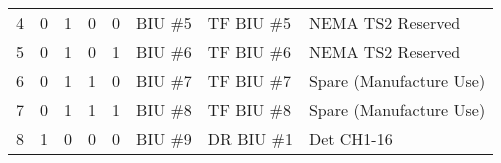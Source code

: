 \documentclass[]{article}
\begin{document}
\begin{table}[ht]
\begin{tabular}{llllllll}
			4            & 0              & 1              & 0              & 0              & BIU \#5                              & TF BIU \#5                            & NEMA TS2 Reserved                                                                                                                                                                                                                                                                                                                                                                         \\
			5            & 0              & 1              & 0              & 1              & BIU \#6                              & TF BIU \#6                            & NEMA TS2 Reserved                                                                                                                                                                                                                                                                                                                                                                         \\
			6            & 0              & 1              & 1              & 0              & BIU \#7                              & TF BIU \#7                            & Spare (Manufacture Use)                                                                                                                                                                                                                                                                                                                                                          \\
			7            & 0              & 1              & 1              & 1              & BIU \#8                              & TF BIU \#8                            & Spare (Manufacture Use)                                                                                                                                                                                                                                                                                                                                                          \\
			\rowcolor[HTML]{EFEFEF} 
			8            & 1              & 0              & 0              & 0              & BIU \#9                              & DR BIU \#1                           & \cellcolor[HTML]{EFEFEF}Det CH1-16                                                                                                                                                                                                                                                                                                                                               \\

\end{tabular}
\end{table}
\end{document}
